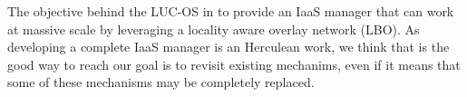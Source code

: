 

				




				





The objective behind the LUC-OS in to provide an IaaS manager that can work at 
massive scale by leveraging a locality aware overlay network (LBO). As 
developing a complete IaaS manager is an Herculean work, we think that is the
good way to reach our goal is to revisit existing mechanims, even if it means 
that some of these mechanisms may be completely replaced.

